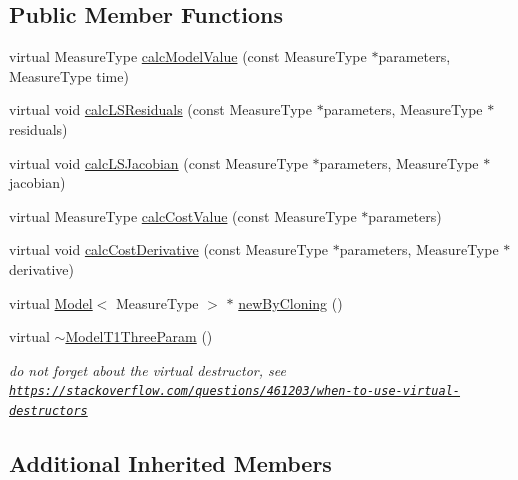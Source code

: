 \subsection*{Public Member Functions}
\begin{DoxyCompactItemize}
\item 
virtual Measure\-Type \hyperlink{class_ox_1_1_model_t1_three_param_a4b2e40499a77399cc3dd74fbe9a02aee}{calc\-Model\-Value} (const Measure\-Type $\ast$parameters, Measure\-Type time)
\item 
virtual void \hyperlink{class_ox_1_1_model_t1_three_param_abef151c12e9b7d49e23955dd1ae9c992}{calc\-L\-S\-Residuals} (const Measure\-Type $\ast$parameters, Measure\-Type $\ast$residuals)
\item 
virtual void \hyperlink{class_ox_1_1_model_t1_three_param_a2b6268cb77c6a9d95c7861641cd3a2d5}{calc\-L\-S\-Jacobian} (const Measure\-Type $\ast$parameters, Measure\-Type $\ast$jacobian)
\item 
virtual Measure\-Type \hyperlink{class_ox_1_1_model_t1_three_param_ad417e4455caae28f1364f82b5f8f37d5}{calc\-Cost\-Value} (const Measure\-Type $\ast$parameters)
\item 
virtual void \hyperlink{class_ox_1_1_model_t1_three_param_a7bd09162c315aa491af661cf8d88bcdd}{calc\-Cost\-Derivative} (const Measure\-Type $\ast$parameters, Measure\-Type $\ast$derivative)
\item 
virtual \hyperlink{class_ox_1_1_model}{Model}$<$ Measure\-Type $>$ $\ast$ \hyperlink{class_ox_1_1_model_t1_three_param_afc6ffe41934c513e12a45cc5821fddca}{new\-By\-Cloning} ()
\item 
\hypertarget{class_ox_1_1_model_t1_three_param_a533739a9eda1cb9d006e292bae466082}{virtual \hyperlink{class_ox_1_1_model_t1_three_param_a533739a9eda1cb9d006e292bae466082}{$\sim$\-Model\-T1\-Three\-Param} ()}\label{class_ox_1_1_model_t1_three_param_a533739a9eda1cb9d006e292bae466082}

\begin{DoxyCompactList}\small\item\em do not forget about the virtual destructor, see \href{https://stackoverflow.com/questions/461203/when-to-use-virtual-destructors}{\tt https\-://stackoverflow.\-com/questions/461203/when-\/to-\/use-\/virtual-\/destructors} \end{DoxyCompactList}\end{DoxyCompactItemize}
\subsection*{Additional Inherited Members}


